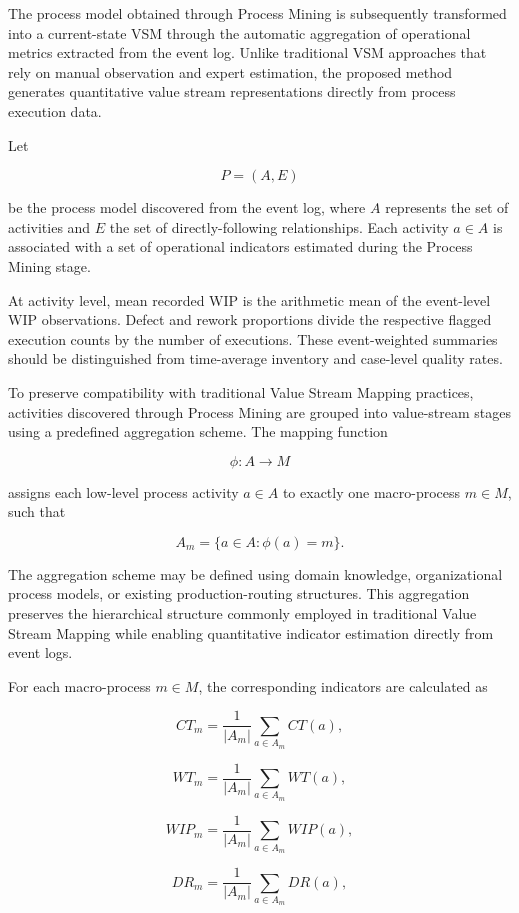 \documentclass[pdflatex,iicol,Numbered,sn-basic]{sn-jnl}
\begin{document}
The process model obtained through Process Mining is subsequently transformed into a current-state VSM through the automatic aggregation of operational metrics extracted from the event log. Unlike traditional VSM approaches that rely on manual observation and expert estimation, the proposed method generates quantitative value stream representations directly from process execution data.

Let

\[
P=(A,E)
\]

be the process model discovered from the event log, where \(A\) represents the set of activities and \(E\) the set of directly-following relationships. Each activity \(a \in A\) is associated with a set of operational indicators estimated during the Process Mining stage.

At activity level, mean recorded WIP is the arithmetic mean of the event-level WIP observations. Defect and rework proportions divide the respective flagged execution counts by the number of executions. These event-weighted summaries should be distinguished from time-average inventory and case-level quality rates.

To preserve compatibility with traditional Value Stream Mapping practices, activities discovered through Process Mining are grouped into value-stream stages using a predefined aggregation scheme. The mapping function

\[
\phi : A \rightarrow M
\]

assigns each low-level process activity \(a \in A\) to exactly one macro-process \(m \in M\), such that

\[
A_m = \{a \in A : \phi(a)=m\}.
\]

The aggregation scheme may be defined using domain knowledge, organizational process models, or existing production-routing structures. This aggregation preserves the hierarchical structure commonly employed in traditional Value Stream Mapping while enabling quantitative indicator estimation directly from event logs.

For each macro-process \(m \in M\), the corresponding indicators are calculated as

\[
CT_m
=
\frac{1}{|A_m|}
\sum_{a\in A_m}
CT(a),
\]

\[
WT_m
=
\frac{1}{|A_m|}
\sum_{a\in A_m}
WT(a),
\]

\[
WIP_m
=
\frac{1}{|A_m|}
\sum_{a\in A_m}
WIP(a),
\]

\[
DR_m
=
\frac{1}{|A_m|}
\sum_{a\in A_m}
DR(a),
\]
\end{document}
